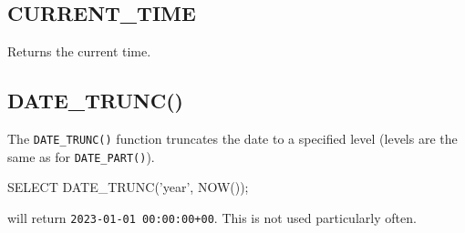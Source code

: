 \subsection*{CURRENT\_TIME}
Returns the current time.

\subsection*{DATE\_TRUNC()}
The \verb|DATE_TRUNC()| function truncates the date to a specified level (levels are the same as for \verb|DATE_PART()|).
\begin{sql}
SELECT DATE_TRUNC('year', NOW());
\end{sql}
will return \verb|2023-01-01 00:00:00+00|. This is not used particularly often.